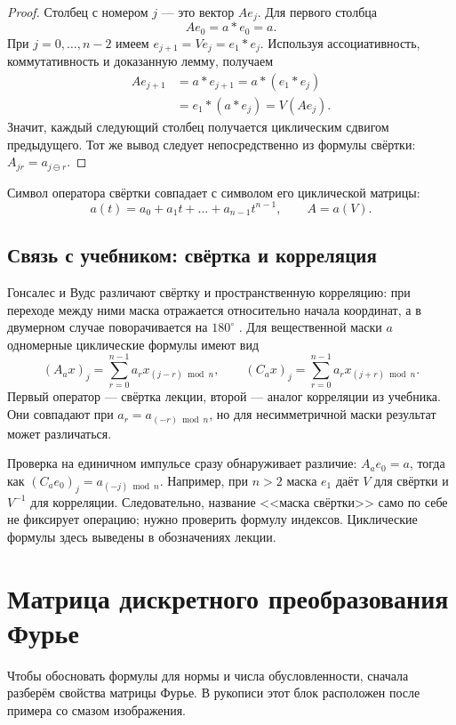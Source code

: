 \documentclass[12pt,a4paper]{article}
\theoremstyle{definition}
\theoremstyle{remark}
\begin{document}
\begin{proof}
Столбец с номером $j$ --- это вектор $Ae_j$. Для первого столбца
\[
  Ae_0=a*e_0=a.
\]
При $j=0,\dots,n-2$ имеем $e_{j+1}=Ve_j=e_1*e_j$. Используя
ассоциативность, коммутативность и доказанную лемму, получаем
\begin{align*}
  Ae_{j+1}&=a*e_{j+1}=a*(e_1*e_j)\\
           &=e_1*(a*e_j)=V(Ae_j).
\end{align*}
Значит, каждый следующий столбец получается циклическим сдвигом
предыдущего. Тот же вывод следует непосредственно из формулы свёртки:
$A_{jr}=a_{j\ominus r}$.
\end{proof}

Символ оператора свёртки совпадает с символом его циклической матрицы:
\[
  a(t)=a_0+a_1t+\dots+a_{n-1}t^{n-1},\qquad A=a(V).
\]

\subsection{Связь с учебником: свёртка и корреляция}

Гонсалес и Вудс различают свёртку и пространственную корреляцию:
при переходе между ними маска отражается относительно начала
координат, а в двумерном случае поворачивается на $180^\circ$
\cite[\S\,3.4.2, с.~188--192]{GW2012}.
Для вещественной маски $a$ одномерные циклические формулы имеют вид
\[
  (A_ax)_j=\sum_{r=0}^{n-1}a_r x_{(j-r)\bmod n},\qquad
  (C_ax)_j=\sum_{r=0}^{n-1}a_r x_{(j+r)\bmod n}.
\]
Первый оператор --- свёртка лекции, второй --- аналог корреляции
из учебника. Они совпадают при $a_r=a_{(-r)\bmod n}$, но для
несимметричной маски результат может различаться.

Проверка на единичном импульсе сразу обнаруживает различие:
$A_ae_0=a$, тогда как $(C_ae_0)_j=a_{(-j)\bmod n}$.
Например, при $n>2$ маска $e_1$ даёт $V$ для свёртки и $V^{-1}$
для корреляции. Следовательно, название <<маска свёртки>>
само по себе не фиксирует операцию; нужно проверить формулу
индексов. Циклические формулы здесь выведены в обозначениях лекции.

\section{Матрица дискретного преобразования Фурье}
\label{sec:fourier}

Чтобы обосновать формулы для нормы и числа обусловленности, сначала
разберём свойства матрицы Фурье. В рукописи этот блок расположен после
примера со смазом изображения.
\end{document}
